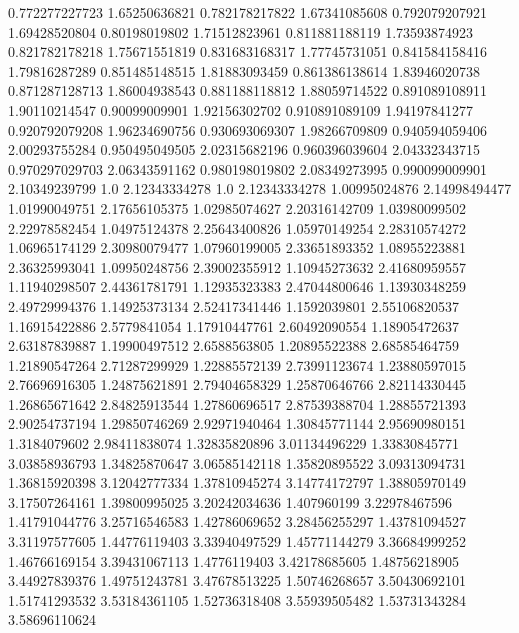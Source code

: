  0.772277227723    1.65250636821
 0.782178217822    1.67341085608
 0.792079207921    1.69428520804
  0.80198019802    1.71512823961
 0.811881188119    1.73593874923
 0.821782178218    1.75671551819
 0.831683168317    1.77745731051
 0.841584158416    1.79816287289
 0.851485148515    1.81883093459
 0.861386138614    1.83946020738
 0.871287128713    1.86004938543
 0.881188118812    1.88059714522
 0.891089108911    1.90110214547
  0.90099009901    1.92156302702
 0.910891089109    1.94197841277
 0.920792079208    1.96234690756
 0.930693069307    1.98266709809
 0.940594059406    2.00293755284
 0.950495049505    2.02315682196
 0.960396039604    2.04332343715
 0.970297029703    2.06343591162
 0.980198019802    2.08349273995
 0.990099009901    2.10349239799
            1.0    2.12343334278
            1.0    2.12343334278
  1.00995024876    2.14998494477
  1.01990049751    2.17656105375
  1.02985074627    2.20316142709
  1.03980099502    2.22978582454
  1.04975124378    2.25643400826
  1.05970149254    2.28310574272
  1.06965174129    2.30980079477
  1.07960199005    2.33651893352
  1.08955223881    2.36325993041
  1.09950248756    2.39002355912
  1.10945273632    2.41680959557
  1.11940298507    2.44361781791
  1.12935323383    2.47044800646
  1.13930348259    2.49729994376
  1.14925373134    2.52417341446
   1.1592039801    2.55106820537
  1.16915422886     2.5779841054
  1.17910447761    2.60492090554
  1.18905472637    2.63187839887
  1.19900497512     2.6588563805
  1.20895522388    2.68585464759
  1.21890547264    2.71287299929
  1.22885572139    2.73991123674
  1.23880597015    2.76696916305
  1.24875621891    2.79404658329
  1.25870646766    2.82114330445
  1.26865671642    2.84825913544
  1.27860696517    2.87539388704
  1.28855721393    2.90254737194
  1.29850746269    2.92971940464
  1.30845771144    2.95690980151
   1.3184079602    2.98411838074
  1.32835820896    3.01134496229
  1.33830845771    3.03858936793
  1.34825870647    3.06585142118
  1.35820895522    3.09313094731
  1.36815920398    3.12042777334
  1.37810945274    3.14774172797
  1.38805970149    3.17507264161
  1.39800995025    3.20242034636
    1.407960199    3.22978467596
  1.41791044776    3.25716546583
  1.42786069652    3.28456255297
  1.43781094527    3.31197577605
  1.44776119403    3.33940497529
  1.45771144279    3.36684999252
  1.46766169154    3.39431067113
   1.4776119403    3.42178685605
  1.48756218905    3.44927839376
  1.49751243781    3.47678513225
  1.50746268657    3.50430692101
  1.51741293532    3.53184361105
  1.52736318408    3.55939505482
  1.53731343284    3.58696110624

